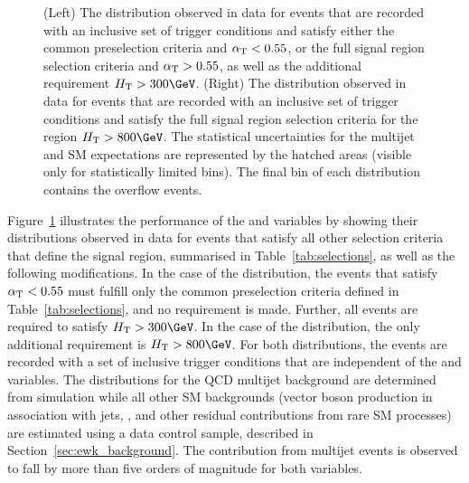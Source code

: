 \begin{figure}[!h]
{%
    (Left) The \alphat distribution observed in data for events that
    are recorded with an inclusive set of trigger conditions and
    satisfy either the common preselection criteria and $\alpha_{\text{T}} <
    0.55$, or the full signal region selection criteria and $\alpha_{\text{T}} >
    0.55$, as well as the additional requirement $\scalht > 300\GeV$.
    (Right) The \bdphi distribution observed in data for events that
    are recorded with an inclusive set of trigger conditions and
    satisfy the full signal region selection criteria for the region
    $\scalht > 800\GeV$. The statistical uncertainties for the
    multijet and SM expectations are represented by the hatched areas
    (visible only for statistically limited bins). The final bin of
    each distribution contains the overflow events.  
  }
  \label{fig:alphat-bdphi} 
\end{figure}


Figure~\ref{fig:alphat-bdphi} illustrates the performance of the
\alphat and \bdphi variables by showing their distributions observed
in data for events that satisfy all other selection criteria that
define the signal region, summarised in Table~\ref{tab:selections}, as
well as the following modifications.
In the case of the \alphat distribution, the events that satisfy
$\alpha_{\text{T}} < 0.55$ must fulfill only the common preselection criteria
defined in Table~\ref{tab:selections}, and no \HTmiss requirement is
made. Further, all events are required to satisfy $\scalht >
300\GeV$. In the case of the \bdphi distribution, the only additional
requirement is $\scalht > 800\GeV$. For both distributions, the events
are recorded with a set of inclusive trigger conditions that are
independent of the \alphat and \bdphi variables. The distributions for
the QCD multijet background are determined from simulation while all
other SM backgrounds (vector boson production in association with
jets, \ttbar, and other residual contributions from rare SM processes)
are estimated using a \mj data control sample, described in
Section~\ref{sec:ewk_background}. The contribution from multijet
events is observed to fall by more than five orders of magnitude for
both variables.

